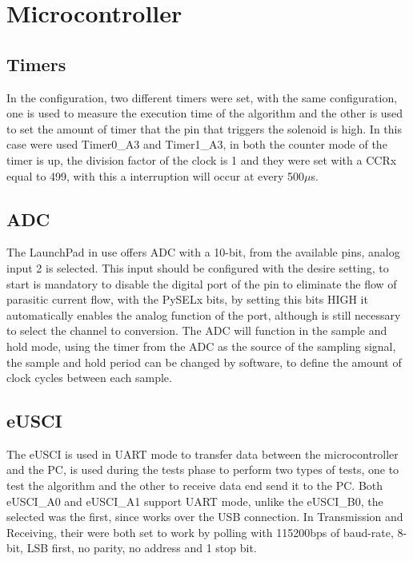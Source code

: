\section{Microcontroller}
%

\subsection*{Timers}
In the configuration, two different timers were set, with the same configuration, one is used to measure the execution time of the algorithm and the other is used to set the amount of timer that the pin that triggers the solenoid is high. In this case were used Timer0\_A3 and Timer1\_A3, in both the counter mode of the timer is up, the division factor of the clock is 1 and they were set with a CCRx equal to 499, with this a interruption will occur at every 500$\mu$s.
\subsection*{ADC}
The LaunchPad in use offers ADC with a 10-bit, from the available pins, analog input 2 is selected. This input should be configured with the desire setting, to start is mandatory to disable the digital port of the pin to eliminate the flow of parasitic current flow, with the PySELx bits, by setting this bits HIGH it automatically enables the analog function of the port, although is still necessary to select the channel to conversion. The ADC will function in the sample and hold mode, using the timer from the ADC as the source of the sampling signal, the sample and hold period can be changed by software, to define the amount of clock cycles between each sample. 
\subsection*{eUSCI}
The eUSCI is used in UART mode to transfer data between the microcontroller and the PC, is used during the tests phase to perform two types of tests, one to test the algorithm and the other to receive data end send it to the PC. Both eUSCI\_A0 and eUSCI\_A1 support UART mode, unlike the eUSCI\_B0, the selected was the first, since works over the USB connection. In Transmission and Receiving, their were both set to work by polling with 115200bps of baud-rate, 8-bit, LSB first, no parity, no address and 1 stop bit.
